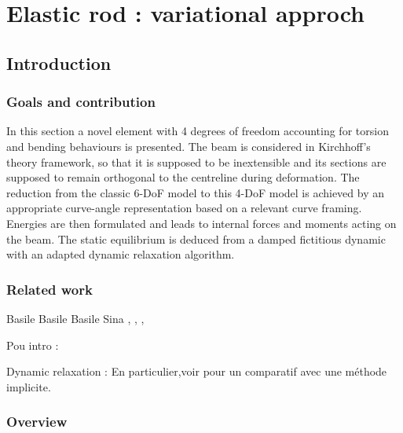 \chapter{Elastic rod : variational approch}



\section{Introduction}

\subsection{Goals and contribution}
In this section a novel element with 4 degrees of freedom accounting for torsion and bending behaviours is presented. The beam is considered in Kirchhoff's theory framework, so that it is supposed to be inextensible and its sections are supposed to remain orthogonal to the centreline during deformation. The reduction from the classic 6-DoF model to this 4-DoF model is achieved by an appropriate curve-angle representation based on a relevant curve framing. Energies are then formulated and leads to internal forces and moments acting on the beam. The static equilibrium is deduced from a damped fictitious dynamic with an adapted dynamic relaxation algorithm.

\subsection{Related work}
Basile \cite{Bergou2010}
Basile \cite{Bergou2008}
Basile \cite{Audoly2010}
Sina \cite{Nabei2014}
\cite{Fuller1978}, \cite{deVries2005},  \cite{Vauquelin2000}, \cite{Berger2009}

Pou intro : \cite{Jung2010}

Dynamic relaxation :
\cite{Lewis2003}
En particulier,voir pour un comparatif avec une méthode implicite.

\subsection{Overview}







